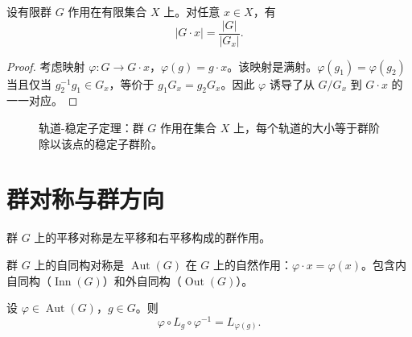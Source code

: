 \begin{theorem}[轨道-稳定子定理]\label{thm:orbit_stabilizer}
设有限群 $G$ 作用在有限集合 $X$ 上。对任意 $x \in X$，有
\[
|G \cdot x| = \frac{|G|}{|G_x|}.
\]
\end{theorem}

\begin{proof}
考虑映射 $\varphi: G \to G \cdot x$，$\varphi(g) = g \cdot x$。该映射是满射。$\varphi(g_1) = \varphi(g_2)$ 当且仅当 $g_2^{-1}g_1 \in G_x$，等价于 $g_1 G_x = g_2 G_x$。因此 $\varphi$ 诱导了从 $G/G_x$ 到 $G \cdot x$ 的一一对应。
\end{proof}

\begin{figure}[htbp]
\centering
{}
\caption{轨道-稳定子定理：群 $G$ 作用在集合 $X$ 上，每个轨道的大小等于群阶除以该点的稳定子群阶。}
\label{fig:orbit_stabilizer}
\end{figure}

\section{\texorpdfstring{群对称与群方向}{群对称与群方向}}

\begin{definition}[群上的平移对称]\label{def:group_translation_symmetry}
群 $G$ 上的平移对称是左平移和右平移构成的群作用。
\end{definition}

\begin{definition}[群的自同构对称]\label{def:group_automorphism_symmetry}
群 $G$ 上的自同构对称是 $\operatorname{Aut}(G)$ 在 $G$ 上的自然作用：$\varphi \cdot x = \varphi(x)$。包含内自同构（$\operatorname{Inn}(G)$）和外自同构（$\operatorname{Out}(G)$）。
\end{definition}

\begin{proposition}[平移与自同构的兼容性]\label{prop:translation_automorphism_compatibility}
设 $\varphi \in \operatorname{Aut}(G)$，$g \in G$。则
\[
\varphi \circ L_g \circ \varphi^{-1} = L_{\varphi(g)}.
\]
\end{proposition}

